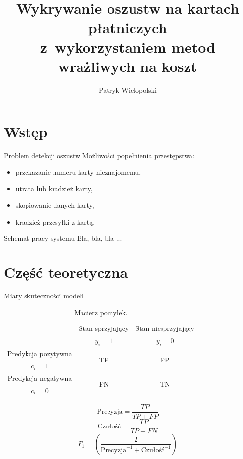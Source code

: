 \documentclass{beamer}
\title{Wykrywanie oszustw na kartach płatniczych \\z~wykorzystaniem metod wrażliwych na koszt}
\institute{Promotor: dr inż. Andrzej Giniewicz \hfill Wydział Matematyki Politechniki Wrocławskiej}
\author{Patryk Wielopolski}
\begin{document}
	
	\newcommand{\htx}{h_{\theta}(\boldsymbol{x_i})}
	\newcommand{\es}{\mathcal{S}}
	\newcommand{\ef}{\mathcal{F}}
	\newcommand{\ku}{\mathcal{Q}}
	\newcommand{\iks}{\boldsymbol{x}}
	\newcommand{\yht}[1]{\hat{y_i}^{(#1)}}
	\newcommand{\ytrue}{\boldsymbol{y}}

\section{Wstęp}

\begin{frame}{Problem detekcji oszustw}
	Możliwości popełnienia przestępstwa:
	\begin{itemize}
		\item przekazanie numeru karty nieznajomemu,
		\item utrata lub kradzież karty,
		\item skopiowanie danych karty,
		\item kradzież przesyłki z kartą.
	\end{itemize}
\end{frame}

\begin{frame}{Schemat pracy systemu}
	Bla, bla, bla ...
\end{frame}

\section{Część teoretyczna}

\begin{frame}{Miary skuteczności modeli}
	\begin{table}
		\begin{center}
			\begin{tabular}{c|c|c}
				\multirow{2}{8em}{} & Stan sprzyjający & Stan niesprzyjający \\
				& $y_i = 1$            & $y_i = 0$ \\
				\hline
				Predykcja pozytywna & \multirow{2}{8em}{\centering TP}& \multirow{2}{8em}{\centering FP} \\
				$c_i = 1$ &  &                 \\
				\hline
				Predykcja negatywna & \multirow{2}{8em}{\centering FN} & \multirow{2}{8em}{\centering TN} \\
				$c_i = 0$ &  &  \\
			\end{tabular}
		\end{center}
		\caption{Macierz pomyłek.}
		\label{tab:macierz-pomylek}
	\end{table}
	$$ \text{Precyzja} = \frac{TP}{TP + FP} $$ 
	$$ \text{Czułość}= \frac{TP}{TP + FN} $$
	$$ F_1 = \left(\frac{2}{\text{Precyzja}^{-1} + \text{Czułość}^{-1}}\right) $$
\end{frame}
\end{document}
